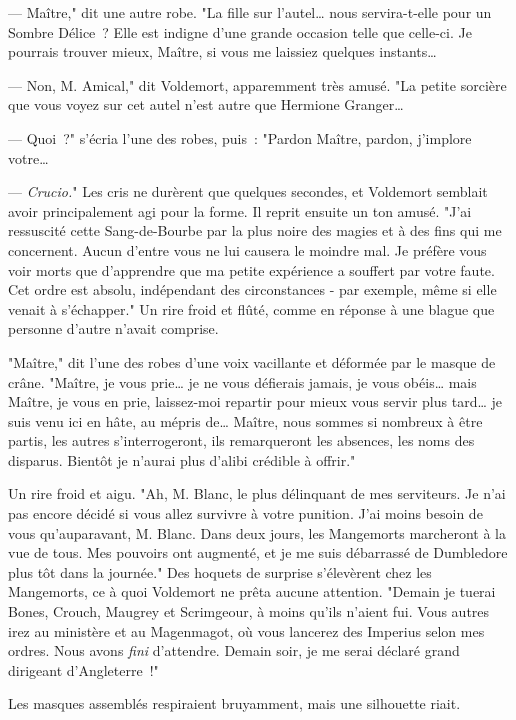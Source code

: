 --- Maître," dit une autre robe. "La fille sur l'autel… nous servira-t-elle pour un Sombre Délice~? Elle est indigne d'une grande occasion telle que celle-ci. Je pourrais trouver mieux, Maître, si vous me laissiez quelques instants…

--- Non, M. Amical," dit Voldemort, apparemment très amusé. "La petite sorcière que vous voyez sur cet autel n'est autre que Hermione Granger…

--- Quoi~?" s'écria l'une des robes, puis~: "Pardon Maître, pardon, j'implore votre…

--- \emph{Crucio.}" Les cris ne durèrent que quelques secondes, et Voldemort semblait avoir principalement agi pour la forme. Il reprit ensuite un ton amusé. "J'ai ressuscité cette Sang-de-Bourbe par la plus noire des magies et à des fins qui me concernent. Aucun d'entre vous ne lui causera le moindre mal. Je préfère vous voir morts que d'apprendre que ma petite expérience a souffert par votre faute. Cet ordre est absolu, indépendant des circonstances - par exemple, même si elle venait à s'échapper." Un rire froid et flûté, comme en réponse à une blague que personne d'autre n'avait comprise.

"Maître," dit l'une des robes d'une voix vacillante et déformée par le masque de crâne. "Maître, je vous prie… je ne vous défierais jamais, je vous obéis… mais Maître, je vous en prie, laissez-moi repartir pour mieux vous servir plus tard… je suis venu ici en hâte, au mépris de… Maître, nous sommes si nombreux à être partis, les autres s'interrogeront, ils remarqueront les absences, les noms des disparus. Bientôt je n'aurai plus d'alibi crédible à offrir."

Un rire froid et aigu. "Ah, M. Blanc, le plus délinquant de mes serviteurs. Je n'ai pas encore décidé si vous allez survivre à votre punition. J'ai moins besoin de vous qu'auparavant, M. Blanc. Dans deux jours, les Mangemorts marcheront à la vue de tous. Mes pouvoirs ont augmenté, et je me suis débarrassé de Dumbledore plus tôt dans la journée." Des hoquets de surprise s'élevèrent chez les Mangemorts, ce à quoi Voldemort ne prêta aucune attention. "Demain je tuerai Bones, Crouch, Maugrey et Scrimgeour, à moins qu'ils n'aient fui. Vous autres irez au ministère et au Magenmagot, où vous lancerez des Imperius selon mes ordres. Nous avons \emph{fini} d'attendre. Demain soir, je me serai déclaré grand dirigeant d'Angleterre~!"

Les masques assemblés respiraient bruyamment, mais une silhouette riait.

